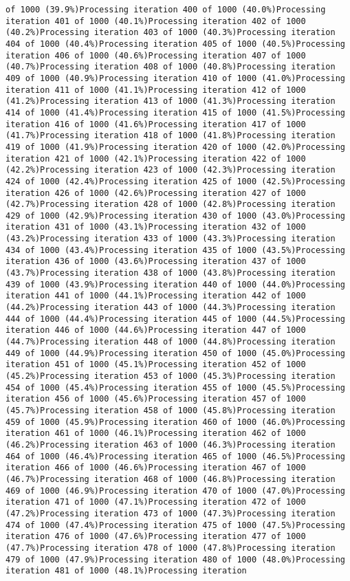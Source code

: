 \documentclass[
]{article}
\begin{document}
\begin{verbatim}
of 1000 (39.9%)Processing iteration 400 of 1000 (40.0%)Processing iteration 401 of 1000 (40.1%)Processing iteration 402 of 1000 (40.2%)Processing iteration 403 of 1000 (40.3%)Processing iteration 404 of 1000 (40.4%)Processing iteration 405 of 1000 (40.5%)Processing iteration 406 of 1000 (40.6%)Processing iteration 407 of 1000 (40.7%)Processing iteration 408 of 1000 (40.8%)Processing iteration 409 of 1000 (40.9%)Processing iteration 410 of 1000 (41.0%)Processing iteration 411 of 1000 (41.1%)Processing iteration 412 of 1000 (41.2%)Processing iteration 413 of 1000 (41.3%)Processing iteration 414 of 1000 (41.4%)Processing iteration 415 of 1000 (41.5%)Processing iteration 416 of 1000 (41.6%)Processing iteration 417 of 1000 (41.7%)Processing iteration 418 of 1000 (41.8%)Processing iteration 419 of 1000 (41.9%)Processing iteration 420 of 1000 (42.0%)Processing iteration 421 of 1000 (42.1%)Processing iteration 422 of 1000 (42.2%)Processing iteration 423 of 1000 (42.3%)Processing iteration 424 of 1000 (42.4%)Processing iteration 425 of 1000 (42.5%)Processing iteration 426 of 1000 (42.6%)Processing iteration 427 of 1000 (42.7%)Processing iteration 428 of 1000 (42.8%)Processing iteration 429 of 1000 (42.9%)Processing iteration 430 of 1000 (43.0%)Processing iteration 431 of 1000 (43.1%)Processing iteration 432 of 1000 (43.2%)Processing iteration 433 of 1000 (43.3%)Processing iteration 434 of 1000 (43.4%)Processing iteration 435 of 1000 (43.5%)Processing iteration 436 of 1000 (43.6%)Processing iteration 437 of 1000 (43.7%)Processing iteration 438 of 1000 (43.8%)Processing iteration 439 of 1000 (43.9%)Processing iteration 440 of 1000 (44.0%)Processing iteration 441 of 1000 (44.1%)Processing iteration 442 of 1000 (44.2%)Processing iteration 443 of 1000 (44.3%)Processing iteration 444 of 1000 (44.4%)Processing iteration 445 of 1000 (44.5%)Processing iteration 446 of 1000 (44.6%)Processing iteration 447 of 1000 (44.7%)Processing iteration 448 of 1000 (44.8%)Processing iteration 449 of 1000 (44.9%)Processing iteration 450 of 1000 (45.0%)Processing iteration 451 of 1000 (45.1%)Processing iteration 452 of 1000 (45.2%)Processing iteration 453 of 1000 (45.3%)Processing iteration 454 of 1000 (45.4%)Processing iteration 455 of 1000 (45.5%)Processing iteration 456 of 1000 (45.6%)Processing iteration 457 of 1000 (45.7%)Processing iteration 458 of 1000 (45.8%)Processing iteration 459 of 1000 (45.9%)Processing iteration 460 of 1000 (46.0%)Processing iteration 461 of 1000 (46.1%)Processing iteration 462 of 1000 (46.2%)Processing iteration 463 of 1000 (46.3%)Processing iteration 464 of 1000 (46.4%)Processing iteration 465 of 1000 (46.5%)Processing iteration 466 of 1000 (46.6%)Processing iteration 467 of 1000 (46.7%)Processing iteration 468 of 1000 (46.8%)Processing iteration 469 of 1000 (46.9%)Processing iteration 470 of 1000 (47.0%)Processing iteration 471 of 1000 (47.1%)Processing iteration 472 of 1000 (47.2%)Processing iteration 473 of 1000 (47.3%)Processing iteration 474 of 1000 (47.4%)Processing iteration 475 of 1000 (47.5%)Processing iteration 476 of 1000 (47.6%)Processing iteration 477 of 1000 (47.7%)Processing iteration 478 of 1000 (47.8%)Processing iteration 479 of 1000 (47.9%)Processing iteration 480 of 1000 (48.0%)Processing iteration 481 of 1000 (48.1%)Processing iteration 
\end{verbatim}
\end{document}
